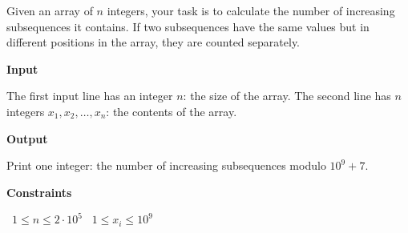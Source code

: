 Given an array of $n$ integers, your task is to calculate the number of increasing subsequences it contains. If two subsequences have the same values but in different positions in the array, they are counted separately.

\vspace{0.3cm}\noindent\textbf{Input}

The first input line has an integer $n$: the size of the array.
The second line has $n$ integers $x_1,x_2,\dots,x_n$: the contents of the array.

\vspace{0.3cm}\noindent\textbf{Output}

Print one integer: the number of increasing subsequences modulo $10^9+7$.

\vspace{0.3cm}\noindent\textbf{Constraints}

\textbullet\ $1 \le n \le 2 \cdot 10^5$
\textbullet\ $1 \le x_i \le 10^9$